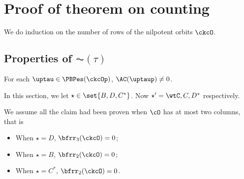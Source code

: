 \documentclass[ssunip]{subfiles}
\begin{document}
\section{Proof of theorem on counting}

We do induction on the number of rows of the nilpotent orbits $\ckcO$.

\subsection{Properties of $\AC(\tau)$}

\begin{prop}
  \begin{enuma}
    \item For each $\uptau\in \PBPes(\ckcOp)$, $\oAC{\uptaup}\neq 0$.
  \end{enuma}
\end{prop}

In this section, we let $\star \in \set{B,D,C^{*}}$. Now
$\star' = \wtC, C, D^{*}$  respectively.

We assume all the claim had been proven when $\cO$ has at most two columns, that
is
\begin{itemize}
  \item When $\star = D$, $\bfrr_{3}(\ckcO) = 0$;
  \item When $\star = B$, $\bfrr_{2}(\ckcO)=0$;%
  \item When $\star = C^{*}$, $\bfrr_{2}(\ckcO)=0$.%
\end{itemize}
\end{document}
